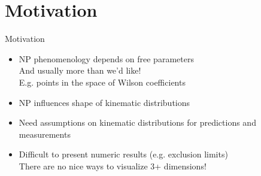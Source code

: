 \section{Motivation}
\begin{frame}{Motivation}
	\begin{itemize}
		\item NP phenomenology depends on free parameters \\
        {\footnotesize And usually more than we'd like!}\\
        {\footnotesize E.g. points in the space of Wilson coefficients}
		\item NP influences shape of kinematic distributions
	\end{itemize} 
	
	\bigskip
	\begin{itemize}
		\item Need assumptions on kinematic distributions for predictions and measurements
		\item Difficult to present numeric results (e.g. exclusion limits)\\
		{\footnotesize There are no nice ways to visualize 3+ dimensions!}\\
	\end{itemize}
\end{frame}
%
